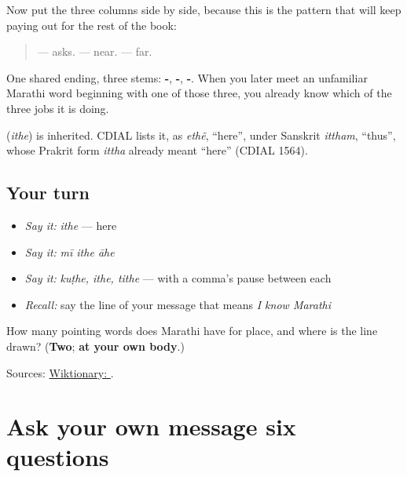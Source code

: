 Now put the three columns side by side, because this is the pattern that will keep paying out for the rest of the book:

\begin{quote}
\textbf{} — asks. \textbf{} — near. \textbf{} — far.
\end{quote}

One shared ending, three stems: \textbf{-}, \textbf{-}, \textbf{-}. When you later meet an unfamiliar Marathi word beginning with one of those three, you already know which of the three jobs it is doing.

\begin{cousinweb}
\textbf{} (\emph{ithe}) is inherited. CDIAL lists it, as \emph{ethẽ}, \textquotedblleft{}here\textquotedblright{}, under Sanskrit \emph{ittham}, \textquotedblleft{}thus\textquotedblright{}, whose Prakrit form \emph{ittha} already meant \textquotedblleft{}here\textquotedblright{} (CDIAL 1564).
\end{cousinweb}

\subsection*{Your turn}
\begin{itemize}
\raggedright
  \item \emph{Say it:} \emph{ithe} — here
  \item \emph{Say it:} \emph{mī ithe āhe}
  \item \emph{Say it:} \emph{kuṭhe, ithe, tithe} — with a comma's pause between each
  \item \emph{Recall:} say the line of your message that means \emph{I know Marathi}
\end{itemize}

\begin{tcolorbox}[breakable,colback=teal!4,colframe=teal!35!black,title={Before you move on}]
How many pointing words does Marathi have for place, and where is the line drawn? (\textbf{Two}; \textbf{at your own body}.)

Sources: \href{https://en.wiktionary.org/wiki/\%E0\%A4\%87\%E0\%A4\%A5\%E0\%A5\%87}{Wiktionary: }.
\end{tcolorbox}
\section[\texorpdfstring{\mr{कोण} · \mr{किती} · \mr{कुठे} … (koṇ · kitī …)}{कोण · किती · कुठे … (koṇ · kitī …)}]{Ask your own message six questions}

